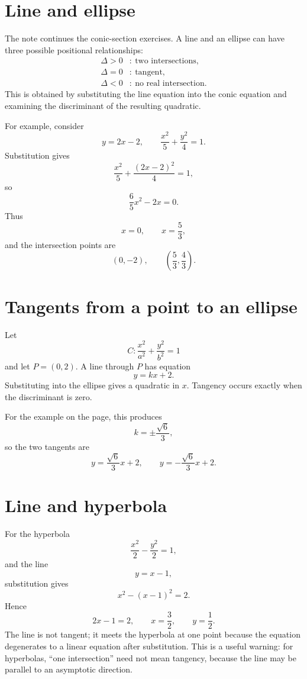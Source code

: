 
\section{Line and ellipse}

The note continues the conic-section exercises.  A line and an ellipse can have three possible positional relationships:
\[
\begin{aligned}
  \Delta>0&:\ \text{two intersections},\\
  \Delta=0&:\ \text{tangent},\\
  \Delta<0&:\ \text{no real intersection}.
\end{aligned}
\]
This is obtained by substituting the line equation into the conic equation and examining the discriminant of the resulting quadratic.

For example, consider
\[
  y=2x-2,\qquad
  \frac{x^2}{5}+\frac{y^2}{4}=1.
\]
Substitution gives
\[
  \frac{x^2}{5}+\frac{(2x-2)^2}{4}=1,
\]
so
\[
  \frac65x^2-2x=0.
\]
Thus
\[
  x=0,\qquad x=\frac53,
\]
and the intersection points are
\[
  (0,-2),\qquad \left(\frac53,\frac43\right).
\]

\section{Tangents from a point to an ellipse}

Let
\[
  C:\frac{x^2}{a^2}+\frac{y^2}{b^2}=1
\]
and let \(P=(0,2)\).  A line through \(P\) has equation
\[
  y=kx+2.
\]
Substituting into the ellipse gives a quadratic in \(x\).  Tangency occurs exactly when the discriminant is zero.

For the example on the page, this produces
\[
  k=\pm\frac{\sqrt6}{3},
\]
so the two tangents are
\[
  y=\frac{\sqrt6}{3}x+2,\qquad
  y=-\frac{\sqrt6}{3}x+2.
\]

\section{Line and hyperbola}

For the hyperbola
\[
  \frac{x^2}{2}-\frac{y^2}{2}=1,
\]
and the line
\[
  y=x-1,
\]
substitution gives
\[
  x^2-(x-1)^2=2.
\]
Hence
\[
  2x-1=2,\qquad x=\frac32,\qquad y=\frac12.
\]
The line is not tangent; it meets the hyperbola at one point because the equation degenerates to a linear equation after substitution.  This is a useful warning: for hyperbolas, ``one intersection'' need not mean tangency, because the line may be parallel to an asymptotic direction.

